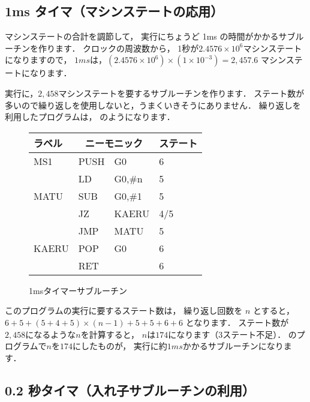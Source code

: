 \subsection{1ms タイマ（マシンステートの応用）}
\label{ms}

マシンステートの合計を調節して，
実行にちょうど 1ms の時間がかかるサブルーチンを作ります．
クロックの周波数から，
1秒が$2.4576 \times 10^{6}$マシンステートになりますので，
$1ms$は，$(2.4576 \times 10^{6}) \times (1 \times 10^{-3}) = 2,457.6$
マシンステートになります．

実行に，$2,458$マシンステートを要するサブルーチンを作ります．
ステート数が多いので繰り返しを使用しないと，うまくいきそうにありません．
繰り返しを利用したプログラムは，
のようになります．

\begin{figure}[btp]
{\small\tt\begin{center}
\begin{tabular}{|l|l l|l|} \hline
ラベル & \multicolumn{2}{|c|}{ニーモニック}& ステート \\
\hline
MS1   & PUSH & G0            & 6   \\
      & LD   & G0,\#n        & 5   \\
MATU  & SUB  & G0,\#1        & 5   \\
      & JZ   & KAERU         & 4/5 \\
      & JMP  & MATU          & 5   \\
KAERU & POP  & G0            & 6   \\
      & RET  &               & 6   \\
\hline
\end{tabular}
\end{center}}
\caption{1msタイマーサブルーチン}
\label{fig:chap6:1ms}
\end{figure}

このプログラムの実行に要するステート数は，
繰り返し回数を $n$ とすると，
$ 6 + 5 + ( 5 + 4 + 5 ) \times (n - 1) + 5 + 5 + 6 + 6$
となります．
ステート数が$2,458$になるような$n$を計算すると，
$n$は$174$になります（3ステート不足）．
のプログラムで$n$を$174$にしたものが，
実行に約$1ms$かかるサブルーチンになります．

\subsection{0.2 秒タイマ（入れ子サブルーチンの利用）}
\label{ms200}

